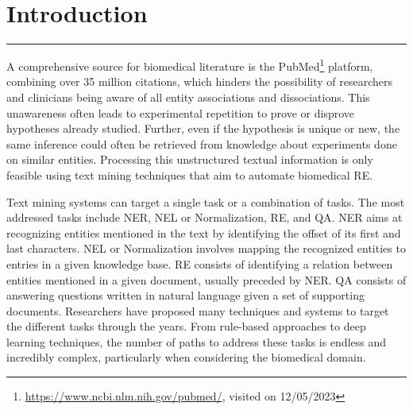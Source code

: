 \hypertarget{1}{}


\chapter{Introduction}

\vspace{-1.6cm}

\begingroup
\color{black}
\par\noindent\rule{\textwidth}{0.4pt}
\endgroup


 A comprehensive source for biomedical literature is the PubMed\footnote{\url{https://www.ncbi.nlm.nih.gov/pubmed/}, visited on 12/05/2023} platform, combining over 35 million citations, which hinders the possibility of researchers and clinicians being aware of all entity associations and dissociations. This unawareness often leads to experimental repetition to prove or disprove hypotheses already studied. Further, even if the hypothesis is unique or new, the same inference could often be retrieved from knowledge about experiments done on similar entities. Processing this unstructured textual information is only feasible using text mining techniques that aim to automate biomedical \ac{RE}.

Text mining systems can target a single task or a combination of tasks. The most addressed tasks include \ac{NER}, \ac{NEL} or Normalization, \ac{RE}, and \ac{QA}. NER aims at recognizing entities mentioned in the text by identifying the offset of its first and last characters. NEL or Normalization involves mapping the recognized entities to entries in a given knowledge base. RE consists of identifying a relation between entities mentioned in a given document, usually preceded by NER. QA consists of answering questions written in natural language given a set of supporting documents. Researchers have proposed many techniques and systems to target the different tasks through the years. From rule-based approaches to deep learning techniques, the number of paths to address these tasks is endless and incredibly complex, particularly when considering the biomedical domain.     

